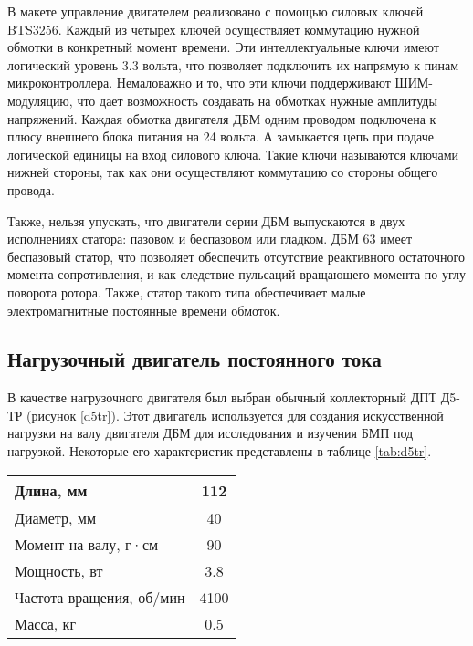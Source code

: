 В макете управление двигателем реализовано с помощью силовых ключей BTS3256. Каждый из четырех
ключей осуществляет коммутацию нужной обмотки в конкретный момент времени. Эти интеллектуальные ключи
имеют логический уровень 3.3 вольта, что позволяет подключить их напрямую к пинам микроконтроллера.
Немаловажно и то, что эти ключи поддерживают ШИМ-модуляцию, что дает возможность создавать на обмотках 
нужные амплитуды напряжений. Каждая обмотка двигателя ДБМ одним проводом подключена к плюсу внешнего 
блока питания на 24 вольта. А замыкается цепь при подаче логической единицы на вход силового ключа.
Такие ключи называются ключами нижней стороны, так как они осуществляют коммутацию со стороны общего провода.

Также, нельзя упускать, что двигатели серии ДБМ выпускаются в двух исполнениях статора: 
пазовом и беспазовом или гладком. ДБМ 63 имеет беспазовый статор, что позволяет обеспечить
отсутствие реактивного остаточного момента сопротивления, и как следствие 
пульсаций вращающего момента по углу поворота ротора. Также, статор
такого типа обеспечивает малые электромагнитные постоянные времени обмоток.

\subsection{Нагрузочный двигатель постоянного тока}

В качестве нагрузочного двигателя был выбран обычный коллекторный ДПТ Д5-ТР (рисунок \ref{d5tr}). 
Этот двигатель используется для создания искусственной нагрузки на валу 
двигателя ДБМ для исследования и изучения БМП под нагрузкой. Некоторые его характеристик
представлены в таблице \ref{tab:d5tr}.


\begin{tabularx}{\textwidth}{|X|c|}
  \caption{Характеристики двигателя Д5-ТР}\label{tab:d5tr}\\
  \hline
    Длина, мм & 112 \\
  \hline
    Диаметр, мм & 40 \\
  \hline
    Момент на валу, г·см & 90 \\
  \hline
    Мощность, вт & 3.8 \\
  \hline
    Частота вращения, об/мин & 4100 \\
  \hline
    Масса, кг & 0.5 \\
  \hline
\end{tabularx}

